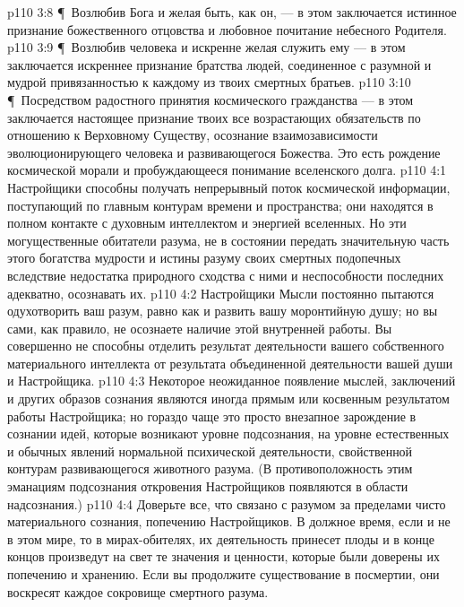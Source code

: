\vs p110 3:8 \P\ \bibnobreakspace Возлюбив Бога и желая быть, как он, --- в этом заключается истинное признание божественного отцовства и любовное почитание небесного Родителя.
\vs p110 3:9 \P\ \bibnobreakspace Возлюбив человека и искренне желая служить ему --- в этом заключается искреннее признание братства людей, соединенное с разумной и мудрой привязанностью к каждому из твоих смертных братьев.
\vs p110 3:10 \P\ \bibnobreakspace Посредством радостного принятия космического гражданства --- в этом заключается настоящее признание твоих все возрастающих обязательств по отношению к Верховному Существу, осознание взаимозависимости эволюционирующего человека и развивающегося Божества. Это есть рождение космической морали и пробуждающееся понимание вселенского долга.
\vs p110 4:1 Настройщики способны получать непрерывный поток космической информации, поступающий по главным контурам времени и пространства; они находятся в полном контакте с духовным интеллектом и энергией вселенных. Но эти могущественные обитатели разума, не в состоянии передать значительную часть этого богатства мудрости и истины разуму своих смертных подопечных вследствие недостатка природного сходства с ними и неспособности последних адекватно, осознавать их.
\vs p110 4:2 Настройщики Мысли постоянно пытаются одухотворить ваш разум, равно как и развить вашу моронтийную душу; но вы сами, как правило, не осознаете наличие этой внутренней работы. Вы совершенно не способны отделить результат деятельности вашего собственного материального интеллекта от результата объединенной деятельности вашей души и Настройщика.
\vs p110 4:3 Некоторое неожиданное появление мыслей, заключений и других образов сознания являются иногда прямым или косвенным результатом работы Настройщика; но гораздо чаще это просто внезапное зарождение в сознании идей, которые возникают уровне подсознания, на уровне естественных и обычных явлений нормальной психической деятельности, свойственной контурам развивающегося животного разума. (В противоположность этим эманациям подсознания откровения Настройщиков появляются в области надсознания.)
\vs p110 4:4 Доверьте все, что связано с разумом за пределами чисто материального сознания, попечению Настройщиков. В должное время, если и не в этом мире, то в мирах\hyp{}обителях, их деятельность принесет плоды и в конце концов произведут на свет те значения и ценности, которые были доверены их попечению и хранению. Если вы продолжите существование в посмертии, они воскресят каждое сокровище смертного разума.
